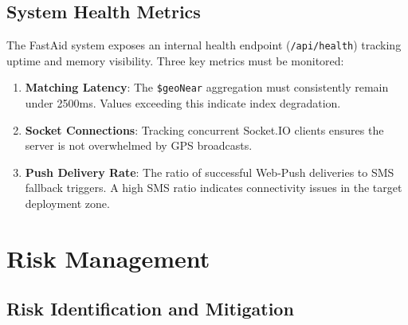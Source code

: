 \documentclass[12pt,a4paper]{article}
\begin{document}
\subsection{System Health Metrics}
The FastAid system exposes an internal health endpoint (\texttt{/api/health}) tracking uptime and memory visibility. Three key metrics must be monitored:
\begin{enumerate}[leftmargin=2em]
  \item \textbf{Matching Latency}: The \texttt{\$geoNear} aggregation must consistently remain under 2500ms. Values exceeding this indicate index degradation.
  \item \textbf{Socket Connections}: Tracking concurrent Socket.IO clients ensures the server is not overwhelmed by GPS broadcasts.
  \item \textbf{Push Delivery Rate}: The ratio of successful Web-Push deliveries to SMS fallback triggers. A high SMS ratio indicates connectivity issues in the target deployment zone.
\end{enumerate}

\section{Risk Management}

\subsection{Risk Identification and Mitigation}
\end{document}
